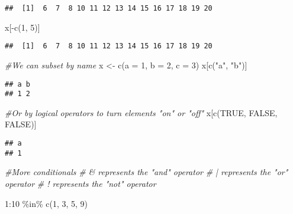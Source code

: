 \documentclass[
]{article}
\newenvironment{Shaded}{\begin{snugshade}}{\end{snugshade}}
\newcommand{\AttributeTok}[1]{\textcolor[rgb]{0.77,0.63,0.00}{#1}}
\newcommand{\CommentTok}[1]{\textcolor[rgb]{0.56,0.35,0.01}{\textit{#1}}}
\newcommand{\ConstantTok}[1]{\textcolor[rgb]{0.00,0.00,0.00}{#1}}
\newcommand{\DecValTok}[1]{\textcolor[rgb]{0.00,0.00,0.81}{#1}}
\newcommand{\FunctionTok}[1]{\textcolor[rgb]{0.00,0.00,0.00}{#1}}
\newcommand{\NormalTok}[1]{#1}
\newcommand{\OtherTok}[1]{\textcolor[rgb]{0.56,0.35,0.01}{#1}}
\newcommand{\SpecialCharTok}[1]{\textcolor[rgb]{0.00,0.00,0.00}{#1}}
\newcommand{\StringTok}[1]{\textcolor[rgb]{0.31,0.60,0.02}{#1}}
\begin{document}
\begin{verbatim}
##  [1]  6  7  8 10 11 12 13 14 15 16 17 18 19 20
\end{verbatim}

\begin{Shaded}
\begin{Highlighting}[]
\NormalTok{x[}\SpecialCharTok{{-}}\FunctionTok{c}\NormalTok{(}\DecValTok{1}\NormalTok{, }\DecValTok{5}\NormalTok{)]}
\end{Highlighting}
\end{Shaded}

\begin{verbatim}
##  [1]  6  7  8 10 11 12 13 14 15 16 17 18 19 20
\end{verbatim}

\begin{Shaded}
\begin{Highlighting}[]
\CommentTok{\#We can subset by name}
\NormalTok{x }\OtherTok{\textless{}{-}} \FunctionTok{c}\NormalTok{(}\AttributeTok{a =} \DecValTok{1}\NormalTok{, }\AttributeTok{b =} \DecValTok{2}\NormalTok{, }\AttributeTok{c =} \DecValTok{3}\NormalTok{)}
\NormalTok{x[}\FunctionTok{c}\NormalTok{(}\StringTok{"a"}\NormalTok{, }\StringTok{"b"}\NormalTok{)]}
\end{Highlighting}
\end{Shaded}

\begin{verbatim}
## a b 
## 1 2
\end{verbatim}

\begin{Shaded}
\begin{Highlighting}[]
\CommentTok{\#Or by logical operators to turn elements "on" or "off"}
\NormalTok{x[}\FunctionTok{c}\NormalTok{(}\ConstantTok{TRUE}\NormalTok{, }\ConstantTok{FALSE}\NormalTok{, }\ConstantTok{FALSE}\NormalTok{)]}
\end{Highlighting}
\end{Shaded}

\begin{verbatim}
## a 
## 1
\end{verbatim}

\begin{Shaded}
\begin{Highlighting}[]
\CommentTok{\#More conditionals}
\CommentTok{\# \& represents the "and" operator}
\CommentTok{\# | represents the "or" operator}
\CommentTok{\# ! represents the "not" operator}

\DecValTok{1}\SpecialCharTok{:}\DecValTok{10} \SpecialCharTok{\%in\%} \FunctionTok{c}\NormalTok{(}\DecValTok{1}\NormalTok{, }\DecValTok{3}\NormalTok{, }\DecValTok{5}\NormalTok{, }\DecValTok{9}\NormalTok{)}
\end{Highlighting}
\end{Shaded}
\end{document}
